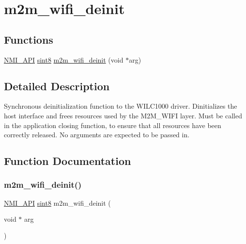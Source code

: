 \hypertarget{group__WifiDeinitFn}{}\section{m2m\+\_\+wifi\+\_\+deinit}
\label{group__WifiDeinitFn}
\subsection*{Functions}
\begin{DoxyCompactItemize}
\item 
\hyperlink{group__BSPDefine_gaecc0323d771e41ef81a76b5f12783e22}{N\+M\+I\+\_\+\+A\+PI} \hyperlink{group__DataT_gae35f10ffd0ac8dd2bc3e794da9bdfbc7}{sint8} \hyperlink{group__WifiDeinitFn_gacadee10a536f3e9817f26aa52b0bb954}{m2m\+\_\+wifi\+\_\+deinit} (void $\ast$arg)
\end{DoxyCompactItemize}


\subsection{Detailed Description}
Synchronous deinitialization function to the W\+I\+L\+C1000 driver. Dinitializes the host interface and frees resources used by the M2\+M\+\_\+\+W\+I\+FI layer. Must be called in the application closing function, to ensure that all resources have been correctly released. No arguments are expected to be passed in. 

\subsection{Function Documentation}
\mbox{\label{group__WifiDeinitFn_gacadee10a536f3e9817f26aa52b0bb954}} 
\subsubsection{\texorpdfstring{m2m\+\_\+wifi\+\_\+deinit()}{m2m\_wifi\_deinit()}}
{\footnotesize\ttfamily \hyperlink{group__BSPDefine_gaecc0323d771e41ef81a76b5f12783e22}{N\+M\+I\+\_\+\+A\+PI} \hyperlink{group__DataT_gae35f10ffd0ac8dd2bc3e794da9bdfbc7}{sint8} m2m\+\_\+wifi\+\_\+deinit (\begin{DoxyParamCaption}\item[{void $\ast$}]{arg }\end{DoxyParamCaption})}



